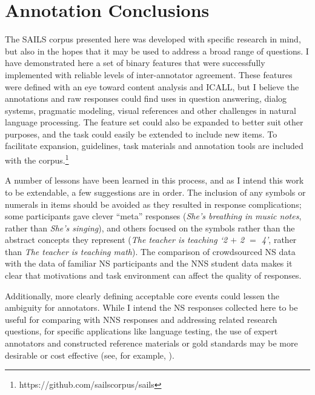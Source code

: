 \section{Annotation Conclusions}
\label{sec:annotation-conclusions}

The SAILS corpus presented here was developed with specific research in mind, but also in the hopes that it may be used to address a broad range of questions. I have demonstrated here a set of binary features that were successfully implemented with reliable levels of inter-annotator agreement. These features were defined with an eye toward content analysis and ICALL, but I believe the annotations and raw responses could find uses in question answering, dialog systems, pragmatic modeling, visual references and other challenges in natural language processing. The feature set could also be expanded to better suit other purposes, and the task could easily be extended to include new items. To facilitate expansion, guidelines, task materials and annotation tools are included with the corpus.\footnote{https://github.com/sailscorpus/sails}

A number of lessons have been learned in this process, and as I intend this work to be extendable, a few suggestions are in order. The inclusion of any symbols or numerals in items should be avoided as they resulted in response complications; some participants gave clever ``meta'' responses (\textit{She's breathing in music notes}, rather than \textit{She's singing}), and others focused on the symbols rather than the abstract concepts they represent (\textit{The teacher is teaching `2 $+$ 2 $=$ 4'}, rather than \textit{The teacher is teaching math}). The comparison of crowdsourced NS data with the data of familiar NS participants and the NNS student data makes it clear that motivations and task environment can affect the quality of responses.

Additionally, more clearly defining acceptable core events could lessen the ambiguity for annotators. While I intend the NS responses collected here to be useful for comparing with NNS responses and addressing related research questions, for specific applications like language testing, the use of expert annotators and constructed reference materials or gold standards may be more desirable or cost effective (see, for example, \citet{somasundaran:chodorow:14}).
